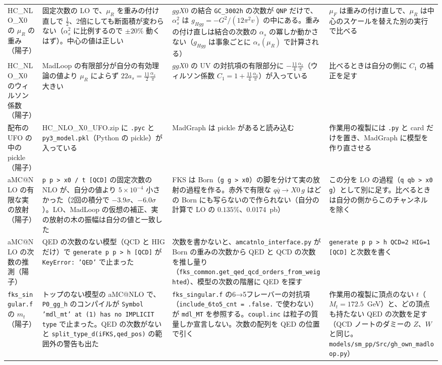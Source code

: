 \documentclass[a4paper,10pt]{ltjsarticle}
\begin{document}
\begin{table}[tbp]
\begin{tabularx}{\linewidth}{>{\raggedright\arraybackslash}p{2.4cm}>{\raggedright\arraybackslash}X>{\raggedright\arraybackslash}X>{\raggedright\arraybackslash}X}
HC\_NLO\_X0 の $\mu_R$ の重み（陽子） & 固定次数の LO で、$\mu_R$ を重みの付け直しで $\frac12$、2倍にしても断面積が変わらない（$\alpha_s^2$ に比例するので $\pm20\%$ 動くはず）。中心の値は正しい & $ggX0$ の結合 \texttt{GC\_3002h} の次数が \texttt{QNP} だけで、$\alpha_s^2$ は $g_{Hgg}=-G^2/(12\pi^2v)$ の中にある。重みの付け直しは結合の次数の $\alpha_s$ の冪しか動かさない（$g_{Hgg}$ は事象ごとに $\alpha_s(\mu_R)$ で計算される） & $\mu_F$ は重みの付け直しで、$\mu_R$ は中心のスケールを替えた別の実行で比べる \\
HC\_NLO\_X0 のウィルソン係数（陽子） & MadLoop の有限部分が自分の有効理論の値より $\mu_R$ によらず $22a_s=\frac{11}2\frac{\alpha_s}\pi$ 大きい & $ggX0$ の UV の対抗項の有限部分に $-\frac{11}4\frac{\alpha_s}\pi$（ウィルソン係数 $C_1=1+\frac{11}4\frac{\alpha_s}\pi$）が入っている & 比べるときは自分の側に $C_1$ の補正を足す \\
配布の UFO の中の pickle（陽子） & HC\_NLO\_X0\_UFO.zip に \texttt{.pyc} と \texttt{py3\_model.pkl}（Python の pickle）が入っている & MadGraph は pickle があると読み込む & 作業用の複製には \texttt{.py} と card だけを置き、MadGraph に模型を作り直させる \\
aMC@NLO の有限な実の放射（陽子） & \texttt{p p > x0 / t [QCD]} の固定次数の NLO が、自分の値より $5\times10^{-4}$ 小さかった（2回の積分で $-3.9\sigma$、$-6.0\sigma$）。LO、MadLoop の仮想の補正、実の放射の木の振幅は自分の値と一致した & FKS は Born（\texttt{g g > x0}）の脚を分けて実の放射の過程を作る。赤外で有限な $q\bar q\to X0\,g$ はどの Born にも写らないので作られない（自分の計算で LO の $0.135\%$、0.0174~pb） & この分を LO の過程（\texttt{q qb > x0 g}）として別に足す。比べるときは自分の側からこのチャンネルを除く \\
aMC@NLO の次数の推測（陽子） & QED の次数のない模型（QCD と HIG だけ）で \texttt{generate p p > h [QCD]} が \texttt{KeyError: 'QED'} で止まった & 次数を書かないと、\texttt{amcatnlo\_interface.py} が Born の重みの次数から QED と QCD の次数を推し量り（\texttt{fks\_common.get\_qed\_qcd\_orders\_from\_weighted}）、模型の次数の階層に QED を探す & \texttt{generate p p > h QCD=2 HIG=1 [QCD]} と次数を書く \\
\texttt{fks\_singular.f} の $m_t$（陽子） & トップのない模型の aMC@NLO で、\texttt{P0\_gg\_h} のコンパイルが \texttt{Symbol 'mdl\_mt' at (1) has no IMPLICIT type} で止まった。QED の次数がないと \texttt{split\_type\_d(iFKS,qed\_pos)} の範囲外の警告も出た & \texttt{fks\_singular.f} の6→5フレーバーの対抗項（\texttt{include\_6to5\_cnt = .false.} で使わない）が \texttt{mdl\_MT} を参照する。\texttt{coupl.inc} は粒子の質量しか宣言しない。次数の配列を QED の位置で引く & 作業用の複製に頂点のない $t$（$M_t=172.5$~GeV）と、どの頂点も持たない QED の次数を足す（QCD ノートのダミーの $Z$、$W$ と同じ。\nolinkurl{models/sm_pp/Src/gh_own_madloop.py}） \\
\bottomrule
\end{tabularx}
\end{table}
\end{document}

